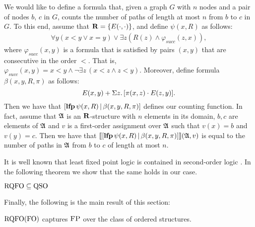\begin{example}
We would like to define a formula that, given a graph $G$ with $n$ nodes and a pair of nodes $b$, $c$ in $G$, counts the number of paths of length at most $n$ from $b$ to $c$ in $G$.
To this end, assume that $\mathbf{R} = \{ E(\cdot,\cdot) \}$, and define $\psi(x,R)$ as follows:
\begin{eqnarray*}
\forall y(x < y \vee x = y) \vee \exists z(R(z) \wedge \varphi_{succ}(z,x)),
\end{eqnarray*}
where $\varphi_{succ}(x,y)$ is a formula that is satisfied by pairs $(x,y)$ that are consecutive in the order $<$. That is, $\varphi_{succ}(x,y) = x < y \wedge \neg \exists z \, (x < z \wedge z < y)$. Moreover, define formula $\beta(x,y,R,\pi)$ as follows:
$$
E(x,y) + \Sigma{z}.\, [\pi(x,z)\cdot E(z,y)].
$$
Then we have that $[{\bf lfp} \, \psi(x,R) \, | \, \beta(x,y,R,\pi)]$ defines our counting function. In fact, assume that $\mathfrak{A}$ is an $\mathbf{R}$-structure with $n$ elements in its domain, $b,c$ are elements of $\mathfrak{A}$ and $v$ is a first-order assignment over $\mathfrak{A}$ such that $v(x) = b$ and $v(y) = c$. Then we have that ${\llbracket{}{[{\bf lfp} \, \psi(x,R) \, | \, \beta(x,y,R,\pi)]}\rrbracket}(\mathfrak{A},v)$ is equal to the  number of paths in $\mathfrak{A}$ from $b$ to $c$ of length at most $n$.
\end{example}


It is well known that least fixed point logic is contained in second-order logic \cite{L04}. In the following theorem we show that the same holds in our case.
\begin{theorem} \label{so-rec}
${\rm RQFO} \subseteq {\rm QSO}$
\end{theorem}

Finally, the following is the main result of this section:
\begin{theorem} \label{rqfo-fo-cap}
	${\rm RQFO}({\rm FO})$ captures $\text{\sc FP}$ over the class of ordered structures.
\end{theorem}


